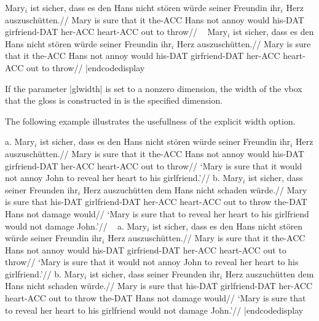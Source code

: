 \def\suff#1{{-\small #1}}%
\framedisplay
\ex[exno={[(6), p. 14]}]
\begingl
\gla Mary$_i$ ist sicher, dass es den Hans nicht st\"oren w\"urde
seiner Freundin ihr$_i$ Herz auszusch\"utten.//
\glb Mary is sure that it the\suff{ACC} Hans not annoy would
his\suff{DAT} girfriend\suff{DAT} her\suff{ACC} heart\suff{ACC} {out to
throw}//
\endgl
\xe
\endframedisplay
\codedisplay~
\ex[exno={[(6), p. 14]}]
\begingl
\gla Mary$_i$ ist sicher, dass es den Hans nicht st\"oren w\"urde
seiner Freundin ihr$_i$ Herz auszusch\"utten.//
\glb Mary is sure that it the\suff{ACC} Hans not annoy would
his\suff{DAT} girfriend\suff{DAT} her\suff{ACC} heart\suff{ACC} {out to
throw}//
\endgl
\xe
|endcodedisplay

If the parameter |glwidth| is set to a nonzero dimension, the width of
the vbox that the gloss is constructed in is the specified dimension.

The following example illustrates the usefullness of the explicit
width option.

a.\quad
\begingl[glwidth=2.6in]
\gla Mary$_i$ ist sicher, dass es den Hans nicht st\"oren w\"urde
seiner Freundin ihr$_i$ Herz auszusch\"utten.//
\glb Mary is sure that it the\suff{ACC} Hans not annoy would
his\suff{DAT} girfriend\suff{DAT} her\suff{ACC} heart\suff{ACC} {out to
throw}//
\glft  `Mary is sure that it would not annoy John to reveal her
heart to his girlfriend.'//
\endgl
\hfil
b.\quad
\begingl[glwidth=2.6in]
\gla Mary$_i$ ist sicher, dass seiner Freunden ihr$_i$ Herz
auszuch\"utten dem Hans nicht schaden w\"urde.//
\glb Mary is sure that his\suff{DAT} girlfriend\suff{DAT} her\suff{ACC}
heart\suff{ACC} {out to throw} the\suff{DAT} Hans not damage would//
\glft `Mary is sure that to reveal her heart to his girlfriend
would not damage John.'//
\endgl
\xe
\codedisplay~
\ex
a.\quad
\begingl[glwidth=2.6in]
\gla Mary$_i$ ist sicher, dass es den Hans nicht st\"oren w\"urde
seiner Freundin ihr$_i$ Herz auszusch\"utten.//
\glb Mary is sure that it the\suff{ACC} Hans not annoy would
his\suff{DAT} girfriend\suff{DAT} her\suff{ACC} heart\suff{ACC} {out to
throw}//
\glft  `Mary is sure that it would not annoy John to reveal her
heart to his girlfriend.'//
\endgl
\hfil
b.\quad
\begingl[glwidth=2.6in]
\gla Mary$_i$ ist sicher, dass seiner Freunden ihr$_i$ Herz
auszuch\"utten dem Hans nicht schaden w\"urde.//
\glb Mary is sure that his\suff{DAT} girlfriend\suff{DAT} her\suff{ACC}
heart\suff{ACC} {out to throw} the\suff{DAT} Hans not damage would//
\glft `Mary is sure that to reveal her heart to his girlfriend
would not damage John.'//
\endgl
\xe
|endcodedisplay


